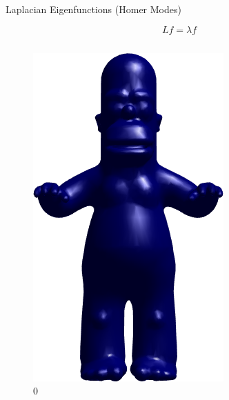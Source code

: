 \documentclass{beamer}
\begin{document}
\begin{frame}{Laplacian Eigenfunctions (Homer Modes)}

\[ L f = \lambda f \]

\begin{columns}
\begin{column}[T]{3cm}
\begin{figure}[t]
    \includegraphics[width=\textwidth]{../23_Spectral/Harmonics/HomerModes/0.png}
    \caption*{\huge 0}
\end{figure}
\end{column}

\end{columns}
\end{frame}
\end{document}
